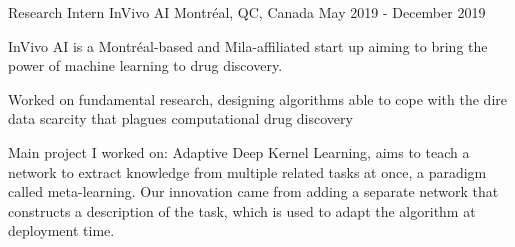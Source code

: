 

\begin{cventries}

  \cventry
    {Research Intern} %
    {InVivo AI} %
    {Montréal, QC, Canada} %
    {May 2019 - December 2019} %
    {
      \begin{cvitems} %
        \item {InVivo AI is a Montréal-based and Mila-affiliated start up aiming to bring the power of machine learning to drug discovery.}
        \item Worked on fundamental research, designing algorithms able to cope with the dire data scarcity that plagues computational drug discovery
        \item Main project I worked on: Adaptive Deep Kernel Learning, aims to teach a network to extract knowledge from multiple related tasks at once, a paradigm called meta-learning. Our innovation came from adding a separate network that constructs a description of the task, which is used to adapt the algorithm at deployment time.
      \end{cvitems}
    }


\end{cventries}
